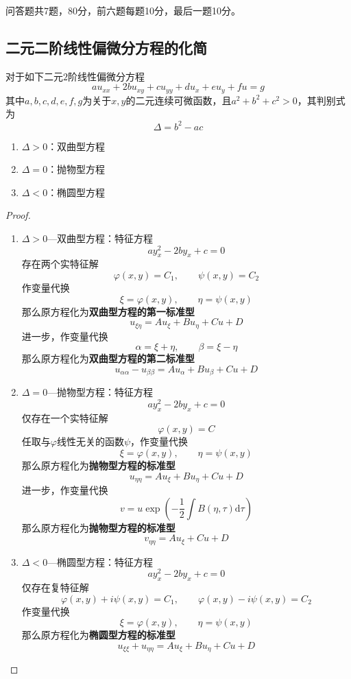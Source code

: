 \documentclass[lang = cn, scheme = chinese, thmcnt = section]{elegantbook}
\newcommand{\dd}{\mathrm{d}}           %
\begin{document}
问答题共7题，80分，前六题每题10分，最后一题10分。

\subsection{二元二阶线性偏微分方程的化简}

\begin{proposition}
	对于如下二元$2$阶线性偏微分方程
	$$
	au_{xx}+2bu_{xy}+cu_{yy}+du_x+eu_y+fu=g
	$$
	其中$a,b,c,d,e,f,g$为关于$x,y$的二元连续可微函数，且$a^2+b^2+c^2>0$，其判别式为%
	$$
	\Delta=b^2-ac
	$$
	\begin{enumerate}
		\item $\Delta>0$：双曲型方程
		\item $\Delta=0$：抛物型方程
		\item $\Delta<0$：椭圆型方程
	\end{enumerate}
\end{proposition}

\begin{proof}
	\begin{enumerate}
		\item $\Delta>0$—双曲型方程：特征方程
		$$
		ay_x^2-2by_x+c=0
		$$
		存在两个实特征解
		$$
		\varphi(x,y)=C_1,\qquad
		\psi(x,y)=C_2
		$$
		作变量代换
		$$
		\xi=\varphi(x,y),\qquad
		\eta=\psi(x,y)
		$$
		那么原方程化为\textbf{双曲型方程的第一标准型}
		$$
		u_{\xi\eta}=Au_\xi+Bu_\eta+Cu+D
		$$
		进一步，作变量代换
		$$
		\alpha=\xi+\eta,\qquad 
		\beta=\xi-\eta
		$$
		那么原方程化为\textbf{双曲型方程的第二标准型}
		$$
		u_{\alpha\alpha}-u_{\beta\beta}=Au_\alpha+Bu_\beta+Cu+D
		$$
		\item $\Delta=0$—抛物型方程：特征方程
		$$
		ay_x^2-2by_x+c=0
		$$
		仅存在一个实特征解
		$$
		\varphi(x,y)=C
		$$
		任取与$\varphi$线性无关的函数$\psi$，作变量代换
		$$
		\xi=\varphi(x,y),\qquad
		\eta=\psi(x,y)
		$$
		那么原方程化为\textbf{抛物型方程的标准型}
		$$
		u_{\eta\eta}=Au_\xi+Bu_\eta+Cu+D
		$$
		进一步，作变量代换
		$$
		v=u\exp\left(-\frac{1}{2}\int B(\eta,\tau)\dd \tau\right)
		$$
		那么原方程化为\textbf{抛物型方程的标准型}
		$$
		v_{\eta\eta}=Au_\xi+Cu+D
		$$
		\item $\Delta<0$—椭圆型方程：特征方程
		$$
		ay_x^2-2by_x+c=0
		$$
		仅存在复特征解
		$$
		\varphi(x,y)+i\psi(x,y)=C_1,\qquad
		\varphi(x,y)-i\psi(x,y)=C_2
		$$
		作变量代换
		$$
		\xi=\varphi(x,y),\qquad
		\eta=\psi(x,y)
		$$
		那么原方程化为\textbf{椭圆型方程的标准型}
		$$
		u_{\xi\xi}+u_{\eta\eta}=Au_\xi+Bu_\eta+Cu+D
		$$
	\end{enumerate}
\end{proof}
\end{document}
